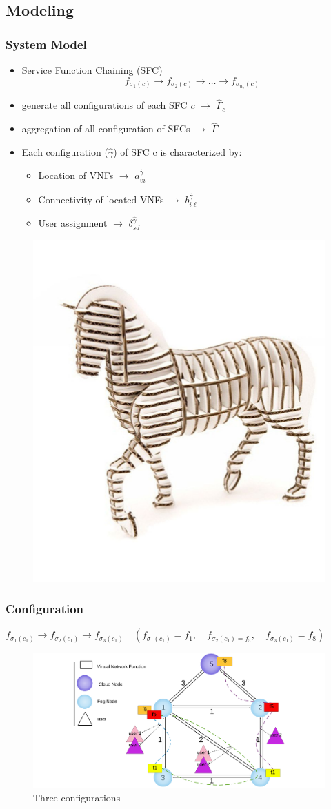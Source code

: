\documentclass{beamer}
\begin{document}
\subsection{Modeling}
\begin{frame}
\frametitle{System Model}
	\begin{itemize}
		\item  {Service Function Chaining (SFC)
	\begin{equation}
	[SFC\: c]\quad f_{\sigma_{1}(c)} \to f_{\sigma_{2}(c)} \to \dots \to f_{\sigma_{n_c}(c)}
	\end{equation}}
		\item {generate all configurations of each SFC $c$  $\to$ $\hat{\Gamma}_c$}
		\item  {aggregation of all configuration of SFCs $\to$ $\hat{\Gamma}$}
		\item  {Each configuration ($\hat{\gamma}$) of SFC c is characterized by:}
		\begin{itemize}
			\item  {Location of VNFs $\to$ $a^{\hat{\gamma}}_{vi}$}
			\item  {Connectivity of located VNFs $\to$ $b^{\hat{\gamma}}_{i\ell}$}
			\item  {User assignment $\to$ $\delta^{\hat{\gamma}}_{sd}$}
		\end{itemize}
	\end{itemize}
		
\begin{figure}
	\centering
	\includegraphics[width=0.2\linewidth]{modeling}
	\caption{}
	\label{fig:modeling}
\end{figure}
\end{frame}
\begin{frame}
	\frametitle{Configuration}
	$f_{\sigma_{1}(c_1)} \to f_{\sigma_{2}(c_1)}  \to f_{\sigma_{3}(c_1)}\quad (f_{\sigma_{1}(c_1)}=f_1,\quad f_{\sigma_{2}(c_1)=f_5},\quad f_{\sigma_{3}(c_1)}=f_8)$
	
	
\begin{figure}
	\centering
	\includegraphics[width=0.9\linewidth]{"Copy of Network Diagram Template"}
	\caption{
		Three configurations
	}
	\label{fig:copy-of-network-diagram-template}
\end{figure}
\end{frame}
\end{document}
